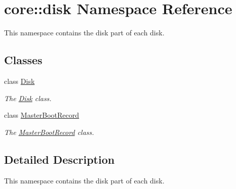 \hypertarget{namespacecore_1_1disk}{}\section{core\+:\+:disk Namespace Reference}
\label{namespacecore_1_1disk}


This namespace contains the disk part of each disk.  


\subsection*{Classes}
\begin{DoxyCompactItemize}
\item 
class \mbox{\hyperlink{classcore_1_1disk_1_1_disk}{Disk}}
\begin{DoxyCompactList}\small\item\em The \mbox{\hyperlink{classcore_1_1disk_1_1_disk}{Disk}} class. \end{DoxyCompactList}\item 
class \mbox{\hyperlink{classcore_1_1disk_1_1_master_boot_record}{Master\+Boot\+Record}}
\begin{DoxyCompactList}\small\item\em The \mbox{\hyperlink{classcore_1_1disk_1_1_master_boot_record}{Master\+Boot\+Record}} class. \end{DoxyCompactList}\end{DoxyCompactItemize}


\subsection{Detailed Description}
This namespace contains the disk part of each disk. 